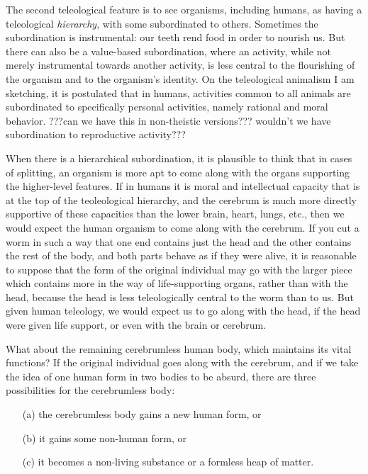 The second teleological feature is to see organisms, including humans, as having a teleological \textit{hierarchy}, with some
\tele{} subordinated to others. Sometimes the subordination is instrumental: our teeth rend food in order to nourish us. 
But there can also be a value-based subordination, where an activity, while not merely instrumental towards another activity, 
is less central to the flourishing of the organism and to the organism's identity. On the teleological animalism I am sketching,
it is postulated that in humans, activities common to all animals are subordinated to specifically personal activities, namely 
rational and moral behavior. ???can we have this in non-theistic versions??? wouldn't we have subordination to reproductive
activity???

When there is a hierarchical subordination, it is plausible to think that in cases of splitting, an organism is more apt
to come along with the organs supporting the higher-level features. If in humans it is moral and intellectual capacity 
that is at the top of the teoleological hierarchy, and the cerebrum is much more directly supportive of these capacities
than the lower brain, heart, lungs, etc., then we would expect the human organism to come along with the cerebrum. If you
cut a worm in such a way that one end contains just the head and the other contains the rest of the body, and both parts
behave as if they were alive, it is reasonable to suppose that the form of the original individual may go with the larger
piece which contains more in the way of life-supporting organs, rather than with the head, because the head is less 
teleologically central to the worm than to us. But given human teleology, we would expect us to go along with the head,
if the head were given life support, or even with the brain or cerebrum.

What about the remaining cerebrumless human body, which maintains its vital functions? If the original individual goes along
with the cerebrum, and if we take the idea of one human form in two bodies to be absurd, there are three possibilities 
for the cerebrumless body:
\begin{itemize}
\item[(a)] the cerebrumless body gains a new human form, or 
\item[(b)] it gains some non-human form, or 
\item[(c)] it becomes a non-living substance or a formless heap of matter. 
\end{itemize}

